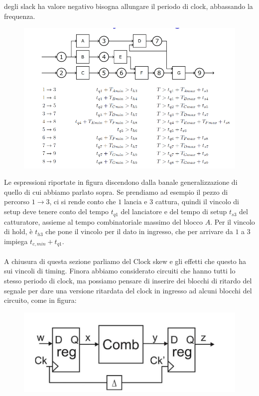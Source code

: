 \documentclass{book}
\begin{document}
        degli slack ha valore negativo bisogna allungare il periodo di clock, abbassando la frequenza.
        \begin{figure}[h!]
            \center  
            \includegraphics[width=0.75\linewidth]{img/chapt12img5.png}
        \end{figure}
        Le espressioni riportate in figura discendono dalla banale generalizzazione di quello di cui abbiamo parlato sopra. Se 
        prendiamo ad esempio il pezzo di percorso $1 \to 3$, ci si rende conto che $1$ lancia e $3$ cattura, quindi il vincolo 
        di setup deve tenere conto del tempo $t_{q1}$ del lanciatore e del tempo di setup $t_{s3}$ del catturatore, assieme al tempo combinatoriale 
        massimo del blocco $A$. Per il vincolo di hold, è $t_{h3}$ che pone il vincolo per il dato in ingresso, che per arrivare 
        da $1$ a $3$ impiega $t_{c,min}+t_{q1}$.
        \\ \\
        A chiusura di questa sezione parliamo del Clock skew e gli effetti che questo ha sui vincoli di timing.
        Finora abbiamo considerato circuiti che hanno tutti lo stesso periodo di clock, ma possiamo pensare di inserire dei 
        blocchi di ritardo del segnale per dare una versione ritardata del clock in ingresso ad alcuni blocchi del circuito, come 
        in figura:
        \begin{figure}[h!]
            \center  
            \includegraphics[width=0.6\linewidth]{img/chapt12img2.png}
        \end{figure} \\
\end{document}
